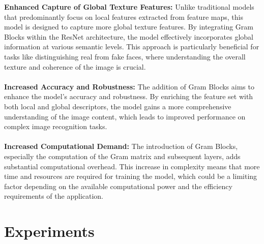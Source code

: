 \documentclass[final]{cvpr}
\begin{document}
\textbf{Enhanced Capture of Global Texture Features:} Unlike traditional models that predominantly focus on local features extracted from feature maps, this model is designed to capture more global texture features. By integrating Gram Blocks within the ResNet architecture, the model effectively incorporates global information at various semantic levels. This approach is particularly beneficial for tasks like distinguishing real from fake faces, where understanding the overall texture and coherence of the image is crucial.
\\
\\
\textbf{Increased Accuracy and Robustness:} The addition of Gram Blocks aims to enhance the model's accuracy and robustness. By enriching the feature set with both local and global descriptors, the model gains a more comprehensive understanding of the image content, which leads to improved performance on complex image recognition tasks.
\\
\\
\textbf{Increased Computational Demand:} The introduction of Gram Blocks, especially the computation of the Gram matrix and subsequent layers, adds substantial computational overhead. This increase in complexity means that more time and resources are required for training the model, which could be a limiting factor depending on the available computational power and the efficiency requirements of the application.

\section{Experiments}
\end{document}

